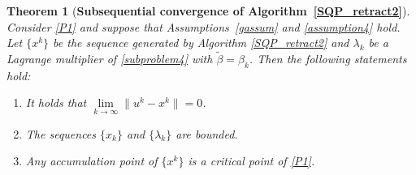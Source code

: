 \documentclass[10pt]{article}
\numberwithin{equation}{section}
\newtheorem{theorem}{Theorem}[section]
\begin{document}
\begin{theorem}[{{\bf Subsequential convergence of Algorithm~\ref{SQP_retract2}}}]\label{convergence3}
Consider \eqref{P1} and suppose that Assumptions~\ref{gassum} and \ref{assumption4} hold. Let $\{x^k\}$ be the sequence generated by Algorithm \ref{SQP_retract2} and $\lambda_k$ be a Lagrange multiplier of \eqref{subproblem4} with $\widetilde{\beta} = \beta_k$.  Then the following statements hold:
\begin{enumerate}[{\rm(i)}]
  \item It holds that $\lim\limits_{k\rightarrow\infty}\|u^k - x^k\| = 0$.
  \item The sequences $\{x_k\}$ and $\{\lambda_k\}$ are bounded.
  \item Any accumulation point of $\{x^k\}$ is a critical point of \eqref{P1}.
\end{enumerate}
\end{theorem}
%
\end{document}
